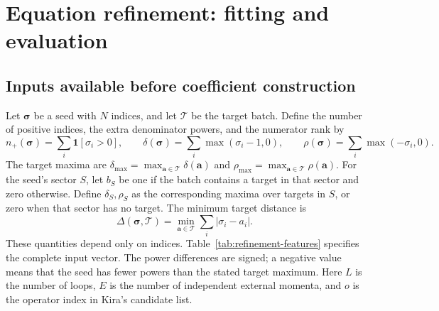\section{Equation refinement: fitting and evaluation}
\label{app:equation-refinement}
\subsection{Inputs available before coefficient construction}
Let $\boldsymbol\sigma$ be a seed with $N$ indices, and let $\mathcal T$ be the target batch. Define the number of positive indices, the extra denominator powers, and the numerator rank by
\begin{equation}
 n_+(\boldsymbol\sigma)=\sum_i\mathbf 1[\sigma_i>0],\qquad
 \delta(\boldsymbol\sigma)=\sum_i\max(\sigma_i-1,0),\qquad
 \rho(\boldsymbol\sigma)=\sum_i\max(-\sigma_i,0).
\end{equation}
The target maxima are $\delta_{\max}=\max_{\boldsymbol a\in\mathcal T}\delta(\boldsymbol a)$ and $\rho_{\max}=\max_{\boldsymbol a\in\mathcal T}\rho(\boldsymbol a)$. For the seed's sector $S$, let $b_S$ be one if the batch contains a target in that sector and zero otherwise. Define $\delta_S,\rho_S$ as the corresponding maxima over targets in $S$, or zero when that sector has no target. The minimum target distance is
\begin{equation}
 \Delta(\boldsymbol\sigma,\mathcal T)
 =\min_{\boldsymbol a\in\mathcal T}\sum_i|\sigma_i-a_i|.
\end{equation}
These quantities depend only on indices. Table~\ref{tab:refinement-features} specifies the complete input vector. The power differences are signed; a negative value means that the seed has fewer powers than the stated target maximum. Here $L$ is the number of loops, $E$ is the number of independent external momenta, and $o$ is the operator index in Kira's candidate list.

